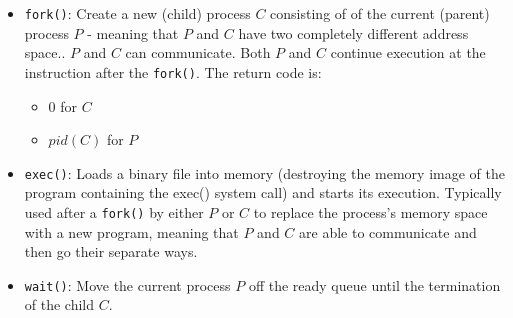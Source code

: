     \begin{itemize}
      \item \lstinline{fork()}: Create a new (child) process $C$ consisting of  of the current (parent) process $P$ - meaning that $P$ and $C$ have two completely different address space.. $P$ and $C$ can communicate. Both $P$ and $C$ continue execution at the instruction after the \lstinline{fork()}. The return code is:
        \begin{itemize}
          \item 0 for $C$
          \item $pid(C)$ for $P$
        \end{itemize}
      \item \lstinline{exec()}: Loads a binary file into memory (destroying the memory image of the program containing the exec() system call) and starts its execution. Typically used after a \lstinline{fork()} by either $P$ or $C$ to replace the process's memory space with a new program, meaning that $P$ and $C$ are able to communicate and then go their separate ways.
      \item \lstinline{wait()}: Move the current process $P$ off the ready queue until the termination of the child $C$.
    \end{itemize}

